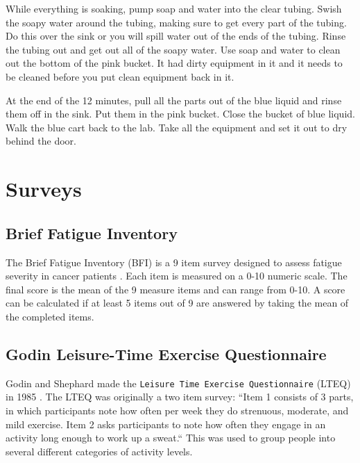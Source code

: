 \documentclass[
]{book}
\begin{document}
While everything is soaking, pump soap and water into the clear tubing. Swish the soapy water around the tubing, making sure to get every part of the tubing. Do this over the sink or you will spill water out of the ends of the tubing. Rinse the tubing out and get out all of the soapy water. Use soap and water to clean out the bottom of the pink bucket. It had dirty equipment in it and it needs to be cleaned before you put clean equipment back in it.

At the end of the 12 minutes, pull all the parts out of the blue liquid and rinse them off in the sink. Put them in the pink bucket. Close the bucket of blue liquid. Walk the blue cart back to the lab. Take all the equipment and set it out to dry behind the door.

\hypertarget{Appendix-Surveys}{%
\chapter{Surveys}\label{Appendix-Surveys}}

\hypertarget{Appendix-Surveys-bfi}{%
\section{Brief Fatigue Inventory}\label{Appendix-Surveys-bfi}}

The Brief Fatigue Inventory (BFI) is a 9 item survey designed to assess fatigue severity in cancer patients \citep{mendoza1999}. Each item is measured on a 0-10 numeric scale. The final score is the mean of the 9 measure items and can range from 0-10. A score can be calculated if at least 5 items out of 9 are answered by taking the mean of the completed items.

\hypertarget{Appendix-Surveys-glteq}{%
\section{Godin Leisure-Time Exercise Questionnaire}\label{Appendix-Surveys-glteq}}

Godin and Shephard made the \texttt{Leisure\ Time\ Exercise\ Questionnaire} (LTEQ) in 1985 \citep{godinshepherd85}. The LTEQ was originally a two item survey: ``Item 1 consists of 3 parts, in which participants note how often per week they do strenuous, moderate, and mild exercise. Item 2 asks participants to note how often they engage in an activity long enough to work up a sweat.`` This was used to group people into several different categories of activity levels.
\end{document}

